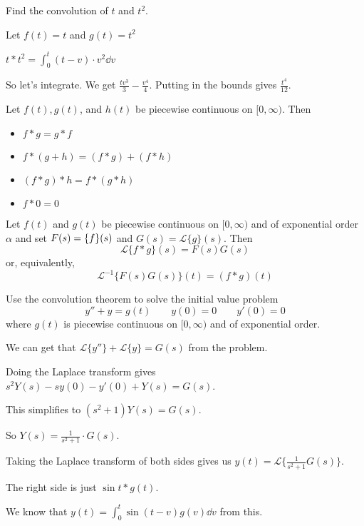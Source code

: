 \documentclass[../diffeq.tex]{subfiles}
\begin{document}
\begin{example}
    Find the convolution of $t$ and $t^2$.

    Let $f(t)=t$ and $g(t)=t^2$

    $t\ast t^2 = \int_0^t (t-v)\cdot v^2 \dd v$

    So let's integrate. We get $\frac{tv^3}{3}-\frac{v^4}{4}$. Putting in the bounds gives $\frac{t^4}{12}$.
\end{example}

\begin{theorem}
    Let $f(t), g(t)$, and $h(t)$ be piecewise continuous on $[0,\infty)$. Then 
    \begin{itemize}
        \item $f\ast g = g\ast f$
        \item $f\ast (g+h) = (f\ast g)+(f\ast h)$
        \item $(f\ast g)\ast h = f\ast (g\ast h)$
        \item $f\ast 0 =0$
    \end{itemize}
\end{theorem}

\begin{theorem}
    Let $f(t)$ and $g(t)$ be piecewise continuous on $[0,\infty)$ and of exponential order $\alpha$ and set $F(s)=\mathcal\{f\}(s)$ and $G(s)=\mathcal{L}\{g\}(s)$. Then 
    \[ \mathcal{L}\{f\ast g\}(s)=F(s)G(s)\]
    or, equivalently,
    \[ \mathcal{L}^{-1}\{F(s)G(s)\}(t)=(f\ast g)(t) \]
\end{theorem}

\begin{example}
    Use the convolution theorem to solve the initial value problem 
    \[ y''+y=g(t) \qquad y(0)=0 \qquad y'(0)=0 \]
    where $g(t)$ is piecewise continuous on $[0,\infty)$ and of exponential order.

    We can get that $\mathcal{L}\{y''\}+\mathcal{L}\{y\} = G(s)$ from the problem.

    Doing the Laplace transform gives $s^2Y(s)-sy(0)-y'(0)+Y(s)=G(s)$.

    This simplifies to $(s^2+1)Y(s)=G(s)$.

    So $Y(s)=\frac{1}{s^2+1}\cdot G(s)$.

    Taking the Laplace transform of both sides gives us $y(t)=\mathcal{L}\{\frac{1}{s^2+1}G(s)\}$.

    The right side is just $\sin t\ast g(t)$.

    We know that $y(t)=\int_0^t \sin(t-v)g(v)\dd v$ from this.
\end{example}
\end{document}
